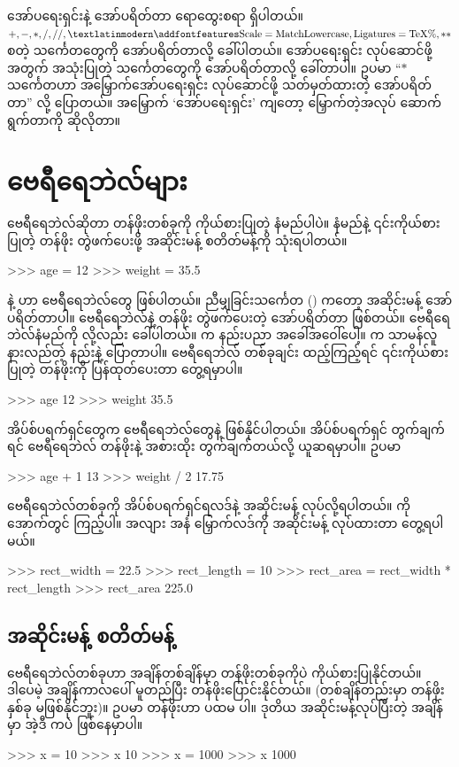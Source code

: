 \begin{mytcbox}
အော်ပရေးရှင်းနဲ့ အော်ပရိတ်တာ ရောထွေးစရာ ရှိပါတယ်။ $+, -, *, /, //, \SI{}{\fEn{\percent}}, **$ စတဲ့ သင်္ကေတတွေကို အော်ပရိတ်တာလို့ ခေါ်ပါတယ်။ အော်ပရေးရှင်း လုပ်ဆောင်ဖို့အတွက် အသုံးပြုတဲ့ သင်္ကေတတွေကို အော်ပရိတ်တာလို့ ခေါ်တာပါ။ ဥပမာ “$*$ သင်္ကေတဟာ အမြှောက်အော်ပရေးရှင်း လုပ်ဆောင်ဖို့ သတ်မှတ်ထားတဲ့ အော်ပရိတ်တာ” လို့ ပြောတယ်။ အမြှောက်  ‘အော်ပရေးရှင်း’ ကျတော့ မြှောက်တဲ့အလုပ် ဆောက်ရွက်တာကို ဆိုလိုတာ။
\end{mytcbox}


\section{ဗေရီရေဘဲလ်များ}
ဗေရီရေဘဲလ်ဆိုတာ တန်ဖိုးတစ်ခုကို ကိုယ်စားပြုတဲ့ နံမည်ပါပဲ။ နံမည်နဲ့ ၎င်းကိုယ်စားပြုတဲ့ တန်ဖိုး တွဲဖက်ပေးဖို့ အဆိုင်းမန့်  စတိတ်မန့်ကို သုံးရပါတယ်။
%
\setlength{\fboxsep}{0pt}
\begin{codetxt}
>>> age = 12
>>> weight = 35.5
\end{codetxt}
%
 နဲ့  ဟာ ဗေရီရေဘဲလ်တွေ ဖြစ်ပါတယ်။   ညီမျှခြင်းသင်္ကေတ (\fCode{=}) ကတော့ အဆိုင်းမန့် အော်ပရိတ်တာပါ။ ဗေရီရေဘဲလ်နဲ့ တန်ဖိုး တွဲဖက်ပေးတဲ့ အော်ပရိတ်တာ ဖြစ်တယ်။ ဗေရီရေဘဲလ်နံမည်ကို   လို့လည်း ခေါ်ပါတယ်။  က နည်းပညာ အခေါ်အဝေါ်ပေါ့။  က သာမန်လူ နားလည်တဲ့ နည်းနဲ့ ပြောတာပါ။ ဗေရီရေဘဲလ် တစ်ခုချင်း ထည့်ကြည့်ရင် ၎င်းကိုယ်စားပြုတဲ့ တန်ဖိုးကို ပြန်ထုတ်ပေးတာ တွေ့ရမှာပါ။
%
\setlength{\fboxsep}{0pt}
\begin{codetxt}
>>> age
12
>>> weight
35.5
\end{codetxt}

%
အိပ်စ်ပရက်ရှင်တွေက ဗေရီရေဘဲလ်တွေနဲ့ ဖြစ်နိုင်ပါတယ်။ အိပ်စ်ပရက်ရှင် တွက်ချက်ရင် ‌ဗေရီရေဘဲလ် တန်ဖိုးနဲ့ အစားထိုး တွက်ချက်တယ်လို့ ယူဆရမှာပါ။ ဥပမာ
%
\setlength{\fboxsep}{0pt}
\begin{codetxt}
>>> age + 1
13
>>> weight / 2
17.75
\end{codetxt}
%
ဗေရီရေဘဲလ်တစ်ခုကို အိပ်စ်ပရက်ရှင်ရလဒ်နဲ့ အဆိုင်းမန့် လုပ်လို့ရပါတယ်။  ကို အောက်တွင် ကြည့်ပါ။ အလျား အနံ မြှောက်လဒ်ကို အဆိုင်းမန့် လုပ်ထားတာ တွေ့ရပါမယ်။
%
\setlength{\fboxsep}{0pt}
\begin{codetxt}
>>> rect_width = 22.5
>>> rect_length = 10
>>> rect_area = rect_width * rect_length
>>> rect_area
225.0
\end{codetxt}
%


\subsection*{အဆိုင်းမန့် စတိတ်မန့်}
ဗေရီရေဘဲလ်တစ်ခုဟာ အချိန်တစ်ချိန်မှာ တန်ဖိုးတစ်ခုကိုပဲ ကိုယ်စားပြုနိုင်တယ်။ ဒါပေမဲ့ အချိန်ကာလပေါ် မူတည်ပြီး တန်ဖိုးပြောင်းနိုင်တယ်။ (တစ်ချိန်တည်းမှာ တန်ဖိုးနှစ်ခု မဖြစ်နိုင်ဘူး)။ ဥပမာ  တန်ဖိုးဟာ ပထမ  ပါ။ ဒုတိယ အဆိုင်းမန့်လုပ်ပြီးတဲ့ အချိန်မှာ အဲ့ဒီ  ကပဲ  ဖြစ်နေမှာပါ။ 
%
\setlength{\fboxsep}{0pt}
\begin{codetxt}
>>> x = 10
>>> x
10
>>> x = 1000
>>> x
1000
\end{codetxt}
%

